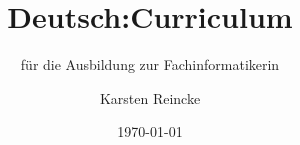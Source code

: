\documentclass[]{beamer}
\title{Deutsch:Curriculum}
\subtitle{für die Ausbildung zur Fachinformatikerin}
\institute[GS-LDK]{Gewerbliche Schulen Dillenburg}
\author{Karsten Reincke}
\date{\today}
\def\cfgGl{../../../cfg.gl/}
\begin{document}

\begin{frame}
  \titlepage

  
\end{frame}





\logo{}
\newpage



%
\end{document}
